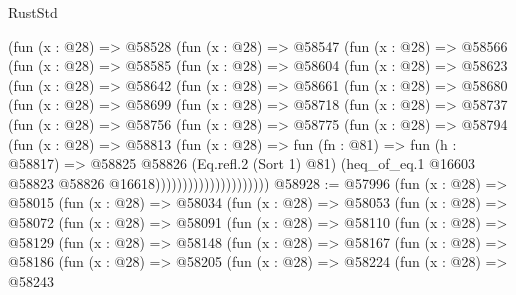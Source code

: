 \begin{lexlean}{RustStd}
\begin{coremodule}
{\begin{coremodule}
{{{{{{{{{{{{{{{{{{{{{{{{{{{{{{{{{{{{{{{{{{{{{{{{{{{{{{{          (fun (x : @28) =>
          @58528
            (fun (x : @28) =>
            @58547
              (fun (x : @28) =>
              @58566
                (fun (x : @28) =>
                @58585
                  (fun (x : @28) =>
                  @58604
                    (fun (x : @28) =>
                    @58623
                      (fun (x : @28) =>
                      @58642
                        (fun (x : @28) =>
                        @58661
                          (fun (x : @28) =>
                          @58680
                            (fun (x : @28) =>
                            @58699
                              (fun (x : @28) =>
                              @58718
                                (fun (x : @28) =>
                                @58737
                                  (fun (x : @28) =>
                                  @58756
                                    (fun (x : @28) =>
                                    @58775
                                      (fun (x : @28) =>
                                      @58794
                                        (fun (x : @28) =>
                                        @58813
                                          (fun (x : @28) =>
                                          fun (fn : @81) =>
                                          fun (h : @58817) =>
                                          @58825
                                            @58826
                                            (Eq.refl.{2} (Sort 1) @81)
                                            (heq_of_eq.{1}
                                              @16603
                                              @58823
                                              @58826
                                              @16618)))))))))))))))))))))
@58928 := @57996
    (fun (x : @28) =>
    @58015
      (fun (x : @28) =>
      @58034
        (fun (x : @28) =>
        @58053
          (fun (x : @28) =>
          @58072
            (fun (x : @28) =>
            @58091
              (fun (x : @28) =>
              @58110
                (fun (x : @28) =>
                @58129
                  (fun (x : @28) =>
                  @58148
                    (fun (x : @28) =>
                    @58167
                      (fun (x : @28) =>
                      @58186
                        (fun (x : @28) =>
                        @58205
                          (fun (x : @28) =>
                          @58224
                            (fun (x : @28) =>
                            @58243
}}}}}}}}}}}}}}}}}}}}}}}}}}}}}}}}}}}}}}}}}}}}}}}}}}}}}}}
\end{coremodule}}
\end{coremodule}
\end{lexlean}
